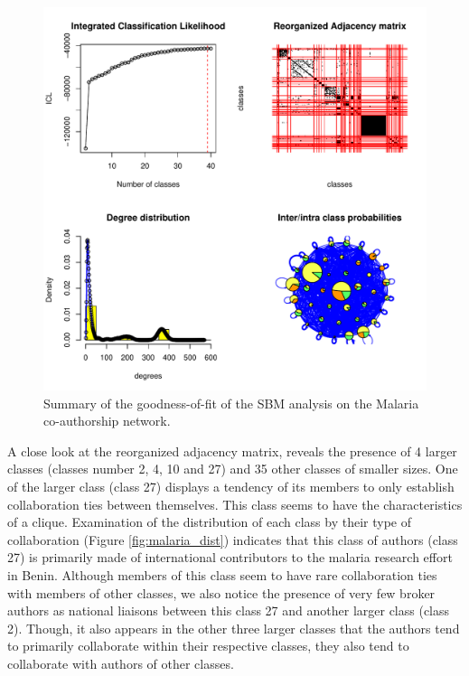 \begin{figure}[!ht]
\centering
\includegraphics[scale=0.75]{Chapters/malaria/statMod/unnamed-chunk-1-1}
\caption{Summary of the goodness-of-fit of the SBM analysis on the Malaria co-authorship network.
}
\label{fig:malaria_sbmgof}
\end{figure}

A close look at the reorganized adjacency matrix, reveals the presence of 4 larger classes (classes number 2, 4, 10 and 27) and 35 other classes of smaller sizes. One of the larger class (class 27) displays a tendency of its members to only establish collaboration ties between themselves. This class seems to have the characteristics of a clique. Examination of the distribution of each class by their type of collaboration (Figure \ref{fig:malaria_dist}) indicates that this class of authors (class 27) is primarily made of international contributors to the malaria research effort in Benin. Although members of this class seem to have rare collaboration ties with members of other classes, we also notice the presence of very few broker authors as national liaisons between this class 27 and another larger class (class 2). Though, it also appears in the other three larger classes that the authors tend to primarily collaborate within their respective classes, they also tend to collaborate with authors of other classes.

